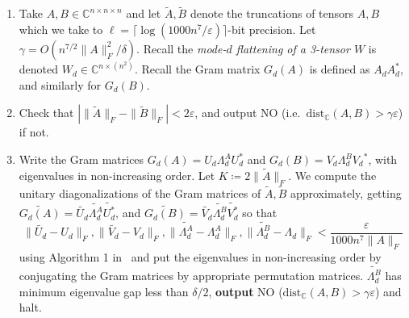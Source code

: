\documentclass[11pt]{article}
\numberwithin{equation}{section}
\theoremstyle{remark}
\newcommand{\C}{\mathbb{C}}
\newcommand{\dist}{\mathrm{dist}}
\newcommand{\CC}{\mathbb{C}}
\begin{document}
\begin{algorithm}[H]
\caption{Orbit distance decision procedure for orthogonal actions.}
\label{alg:approximateOrbitDistance}
\begin{enumerate}[label=Step \arabic*]
\item[\textbf{Input}] Take $A,B\in\C^{n\times n\times n}$ and let $\widetilde{A},\widetilde{B}$ denote the truncations of tensors $A,B$ which we take to $\ell = \lceil\log(1000n^{7}/\varepsilon)\rceil$-bit precision. Let $\gamma = O(n^{7/2}\|A\|^2_F/\delta)$. Recall the \emph{mode-$d$ flattening of a 3-tensor $W$} is denoted $W_{d} \in \C^{n\times (n^2)}$. Recall the Gram matrix $G_d(A)$ is defined as $A_{d}A_{d}^*$, and similarly for $G_d(B)$.

\item\label{alg:magnitude} Check that $\left|\|\widetilde{A}\|_F-\|\widetilde{B}\|_F\right|<2\varepsilon$, and output \textsf{NO} (i.e.\ $\dist_\C(A,B)>\gamma\varepsilon$) if not.

\item\label{alg:stepJNF} Write the Gram matrices $G_d(A)=U_d\Lambda^A_d U_d^*$ and $G_d(B)=V_d\Lambda^B_d {V_d}^*$, with eigenvalues in non-increasing order.
Let $K\coloneqq2\|\widetilde{A}\|_F$.
We compute the unitary diagonalizations of the Gram matrices of $\widetilde{A},\widetilde{B}$ approximately, getting $\widetilde{G_d(A)}=\widetilde{U_d}\widetilde{\Lambda^A_d}\widetilde{U_d^*}$, and $\widetilde{G_d(B)}=\widetilde{V_d}\widetilde{\Lambda^B_d}\widetilde{V_d^*}$ so that 
\begin{equation}
\|\widetilde{U_d}-U_d\|_F,\|\widetilde{V_d}-V_d\|_F,\|\widetilde{\Lambda^A_d}-\Lambda^A_d\|_F,\|\widetilde{\Lambda^B_d}-\Lambda_d\|_F < \frac{\varepsilon}{1000n^7\|A\|_F }\label{eqn:precisionBound}
\end{equation}
using Algorithm 1 in~\cite{dey2023bit}\footnotemark{} and put the eigenvalues in non-increasing order by conjugating the Gram matrices by appropriate permutation matrices.  
$\widetilde{\Lambda^B_d}$ has minimum eigenvalue gap less than $\delta/2$, \textbf{output} \textsf{NO} ($\dist_{\CC}(A,B)>\gamma\varepsilon$) and halt.


\end{enumerate}
\end{algorithm}
\end{document}
